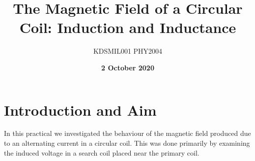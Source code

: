 \documentclass[12pt]{article}
\title{The Magnetic Field of a Circular Coil: Induction and Inductance}
\author{KDSMIL001 \; PHY2004}
\date{\textbf{2 October 2020}}
\numberwithin{equation}{section}
\numberwithin{figure}{section}
\begin{document}
    \begin{titlepage}
        \maketitle
        \center
        \tableofcontents
    \end{titlepage}
    
    \section{Introduction and Aim}
    In this practical we investigated the behaviour of the magnetic field produced due 
    to an alternating current in a circular coil. This was done primarily by examining 
    the induced voltage in a search coil placed near the primary coil. 
\end{document}
